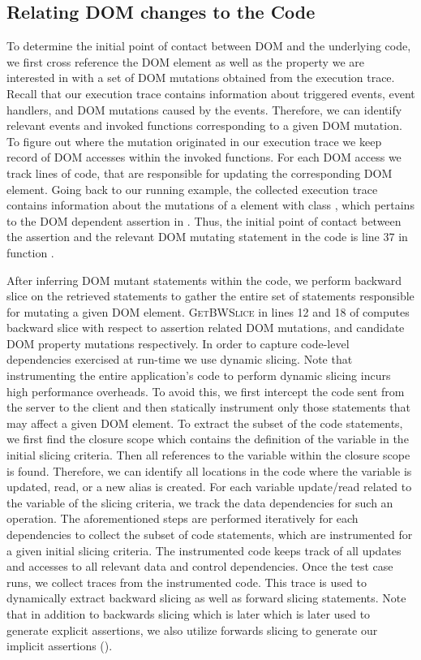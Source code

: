 \subsection{Relating DOM changes to the \javascript Code} \label{Sec:domToCode}
To determine the initial point of contact between DOM and the underlying \javascript code, we first cross reference the DOM element as well as the property we are interested in with a set of DOM mutations obtained from the execution trace. Recall that our execution trace contains information about triggered events, event handlers, and DOM mutations caused by the events. Therefore, we can identify relevant events and invoked functions corresponding to a given DOM mutation. To figure out where the mutation originated in our execution trace we keep record of DOM accesses within the invoked functions. For each DOM access we track \javascript lines of code, that are responsible for updating the corresponding DOM element.
Going back to our running example, the collected execution trace contains information about the mutations of a  element with class , which pertains to the DOM dependent assertion in . Thus, the initial point of contact between the assertion and the relevant DOM mutating statement in the \javascript code is line 37 in function .

After inferring DOM mutant statements within the code, we perform backward slice on the retrieved statements to gather the entire set of \javascript statements responsible for mutating a given DOM element. \textsc{GetBWSlice} in lines 
12 and 18 of  computes backward slice with respect to assertion related DOM mutations, and candidate DOM property mutations respectively.
In order to capture code-level dependencies exercised at run-time we use dynamic slicing. 
Note that instrumenting the entire application's code to perform dynamic slicing incurs high performance overheads. To avoid this, we first intercept the code sent from the server to the client and then statically instrument only those statements that may affect a given DOM element.
To extract the subset of the code statements, we first find the \javascript closure scope which contains the definition of the variable in the initial slicing criteria. Then all references to the variable within the closure scope is found. Therefore, we can identify all locations in the code where the variable is updated, read, or a new alias is created. For each variable update/read related to the variable of the slicing criteria, we track the data dependencies for such an operation. The aforementioned steps are performed iteratively for each dependencies to collect the subset of code statements, which are instrumented for a given initial slicing criteria.
The instrumented code keeps track of all updates and accesses to all relevant data and control dependencies.   
Once the test case runs, we collect traces from the instrumented code. This trace is used to dynamically extract backward slicing as well as forward slicing statements. Note that in addition to backwards slicing which is later which is later used to generate explicit assertions, we also utilize forwards slicing to generate our implicit assertions ().  


